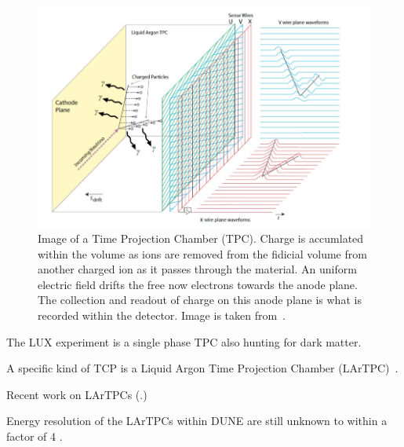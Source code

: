 \begin{figure}[]
\centering
\includegraphics[width=\textwidth]{images/dune_tdrv12020_lartpc-sp.jpg}
\caption{Image of a Time Projection Chamber (TPC). Charge is accumlated within the volume as ions are removed from the fidicial volume from another charged ion as it passes through the material. An uniform electric field drifts the free now electrons towards the anode plane. The collection and readout of charge on this anode plane is what is recorded within the detector. Image is taken from~\citep{DUNE_TDR_V1_Abi_2020}.}
\end{figure}

The LUX experiment is a single phase TPC also hunting for dark matter.

A specific kind of TCP is a Liquid Argon Time Projection Chamber (LArTPC)~\citep{rubbia1977liquid}.

Recent work on LArTPCs (\citep{ArgoNeuT_PhysRevD.99.012002, MicroBooNE_Acciarri_2017, LArIAT_Acciarri_2020}.)

Energy resolution of the LArTPCs within DUNE are still unknown to within a factor of 4 \citep{lartpc_energy_resolution:PhysRevD.99.036009}.

